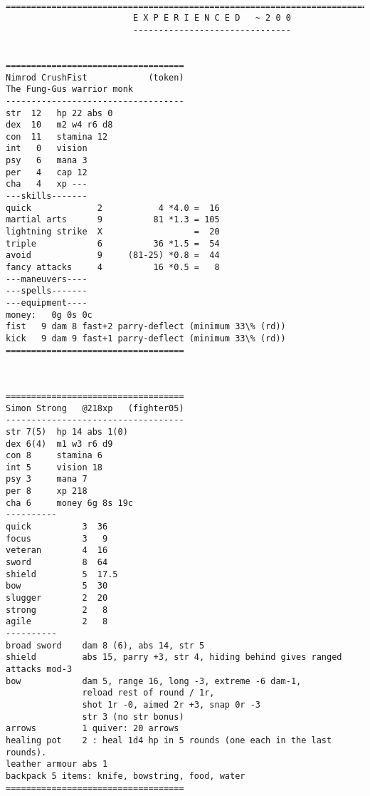 \

\pagebreak[1]
\tiny \begin{samepage} \begin{verbatim}
================================================================================
                         E X P E R I E N C E D   ~ 2 0 0
                         -------------------------------


===================================
Nimrod CrushFist            (token)
The Fung-Gus warrior monk
-----------------------------------
str  12   hp 22 abs 0
dex  10   m2 w4 r6 d8
con  11   stamina 12
int   0   vision
psy   6   mana 3
per   4   cap 12
cha   4   xp ---
---skills-------
quick             2           4 *4.0 =  16
martial arts      9          81 *1.3 = 105
lightning strike  X                  =  20
triple            6          36 *1.5 =  54
avoid             9     (81-25) *0.8 =  44
fancy attacks     4          16 *0.5 =   8
---maneuvers----
---spells-------
---equipment----
money:   0g 0s 0c
fist   9 dam 8 fast+2 parry-deflect (minimum 33\% (rd))
kick   9 dam 9 fast+1 parry-deflect (minimum 33\% (rd))
===================================
\end{verbatim} \end{samepage} \normalsize


\

\pagebreak[1]
\tiny \begin{samepage} \begin{verbatim}
===================================
Simon Strong   @218xp   (fighter05)
-----------------------------------
str 7(5)  hp 14 abs 1(0)
dex 6(4)  m1 w3 r6 d9
con 8     stamina 6
int 5     vision 18
psy 3     mana 7
per 8     xp 218
cha 6     money 6g 8s 19c
----------
quick          3  36
focus          3   9
veteran        4  16
sword          8  64
shield         5  17.5
bow            5  30
slugger        2  20
strong         2   8
agile          2   8
----------
broad sword    dam 8 (6), abs 14, str 5
shield         abs 15, parry +3, str 4, hiding behind gives ranged attacks mod-3
bow            dam 5, range 16, long -3, extreme -6 dam-1,
               reload rest of round / 1r,
               shot 1r -0, aimed 2r +3, snap 0r -3
               str 3 (no str bonus)
arrows         1 quiver: 20 arrows
healing pot    2 : heal 1d4 hp in 5 rounds (one each in the last rounds).
leather armour abs 1
backpack 5 items: knife, bowstring, food, water
===================================
\end{verbatim} \end{samepage} \normalsize


